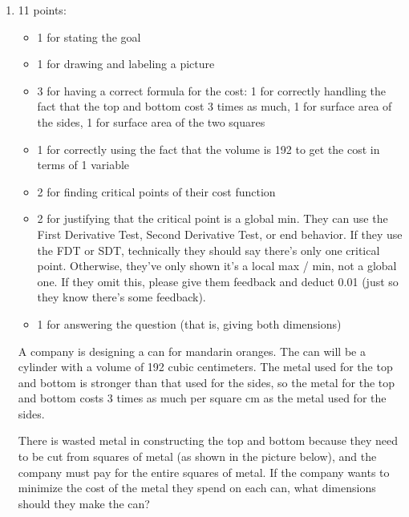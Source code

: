\documentclass{article}
\newcommand{\highlight}[1]{\boldmath\hl{\textbf{#1}}\unboldmath}
\begin{document}
\begin{enumerate}
\begin{solution}
      \highlight{Answer the question:} To maximize the perimeter, the company should make the
      dimensions of the garden .
  \end{solution}

\item %

  \begin{grading}
    11 points:
    \begin{itemize}[nosep]
    \item 1 for stating the goal
    \item 1 for drawing and labeling a picture
    \item 3 for having a correct formula for the cost: 1 for correctly handling the fact that the top and bottom cost 3 times as much, 1 for surface area of the sides, 1 for surface area of the two squares
    \item 1 for correctly using the fact that the volume is 192 to get the cost in terms of 1 variable
    \item 2 for finding critical points of their cost function
    \item 2 for justifying that the critical point is a global min. They can use the First Derivative Test, Second Derivative Test, or end behavior. If they use the FDT or SDT, technically they should say there's only one critical point. Otherwise, they've only shown it's a local max / min, not a global one. If they omit this, please give them feedback and deduct 0.01 (just so they know there's some feedback). 
    \item 1 for answering the question (that is, giving both dimensions)
    \end{itemize}
  \end{grading}

  \begin{problem}[\newpage]
    A company is designing a can for mandarin oranges. The can will be a cylinder with a volume of 192 cubic centimeters. The metal used for the top and bottom is stronger than that used for the sides, so the metal for the top and bottom costs 3 times as much per square cm as the metal used for the sides.

    There is wasted metal in constructing the top and bottom because they need to be cut from squares of metal (as shown in the picture below), and the company must pay for the entire squares of metal. If the company wants to minimize the cost of the metal they spend on each can, what dimensions should they make the can?


\end{problem}
\end{enumerate}
\end{document}
